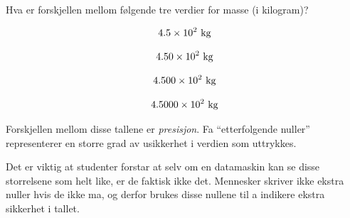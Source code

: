 

Hva er forskjellen mellom følgende tre verdier for masse (i kilogram)?

$$4.5 \times 10^2 \hbox{ kg}$$

$$4.50 \times 10^2 \hbox{ kg}$$

$$4.500 \times 10^2 \hbox{ kg}$$

$$4.5000 \times 10^2 \hbox{ kg}$$







Forskjellen mellom disse tallene er {\it presisjon}.  Fa ``etterfolgende nuller'' representerer en storre grad av usikkerhet i verdien som uttrykkes.







Det er viktig at studenter forstar at selv om en datamaskin kan se disse storrelsene som helt like, er de faktisk ikke det.  Mennesker skriver ikke ekstra nuller hvis de ikke ma, og derfor brukes disse nullene til a indikere ekstra sikkerhet i tallet.




